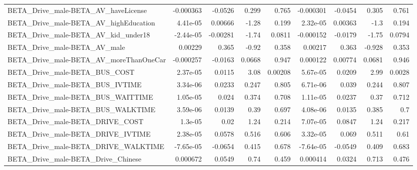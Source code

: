 \begin{tabular}{lrrrrrrrr}
BETA\_Drive\_male-BETA\_AV\_haveLicense                &   -0.000363 &      -0.0526 &    0.299 &    0.765 &  -0.000301 &     -0.0454 &        0.305 &         0.761 \\
BETA\_Drive\_male-BETA\_AV\_highEducation              &    4.41e-05 &      0.00666 &    -1.28 &    0.199 &   2.32e-05 &     0.00363 &         -1.3 &         0.194 \\
BETA\_Drive\_male-BETA\_AV\_kid\_under18                &   -2.44e-05 &     -0.00281 &    -1.74 &   0.0811 &  -0.000152 &     -0.0179 &        -1.75 &        0.0794 \\
BETA\_Drive\_male-BETA\_AV\_male                       &     0.00229 &        0.365 &    -0.92 &    0.358 &    0.00217 &       0.363 &       -0.928 &         0.353 \\
BETA\_Drive\_male-BETA\_AV\_moreThanOneCar             &   -0.000257 &      -0.0163 &   0.0668 &    0.947 &   0.000122 &     0.00774 &       0.0681 &         0.946 \\
BETA\_Drive\_male-BETA\_BUS\_COST                      &    2.37e-05 &       0.0115 &     3.08 &  0.00208 &   5.67e-05 &      0.0209 &         2.99 &        0.0028 \\
BETA\_Drive\_male-BETA\_BUS\_IVTIME                    &    3.34e-06 &       0.0233 &    0.247 &    0.805 &   6.71e-06 &       0.039 &        0.244 &         0.807 \\
BETA\_Drive\_male-BETA\_BUS\_WAITTIME                  &    1.05e-05 &        0.024 &    0.374 &    0.708 &   1.11e-05 &      0.0237 &         0.37 &         0.712 \\
BETA\_Drive\_male-BETA\_BUS\_WALKTIME                  &    3.59e-06 &       0.0139 &     0.39 &    0.697 &   4.08e-06 &      0.0135 &        0.385 &           0.7 \\
BETA\_Drive\_male-BETA\_DRIVE\_COST                    &     1.3e-05 &         0.02 &     1.24 &    0.214 &   7.07e-05 &      0.0847 &         1.24 &         0.217 \\
BETA\_Drive\_male-BETA\_DRIVE\_IVTIME                  &    2.38e-05 &       0.0578 &    0.516 &    0.606 &   3.32e-05 &       0.069 &        0.511 &          0.61 \\
BETA\_Drive\_male-BETA\_DRIVE\_WALKTIME                &   -7.65e-05 &      -0.0654 &    0.415 &    0.678 &  -7.64e-05 &     -0.0549 &        0.409 &         0.683 \\
BETA\_Drive\_male-BETA\_Drive\_Chinese                 &    0.000672 &       0.0549 &     0.74 &    0.459 &   0.000414 &      0.0324 &        0.713 &         0.476 \\

\end{tabular}

